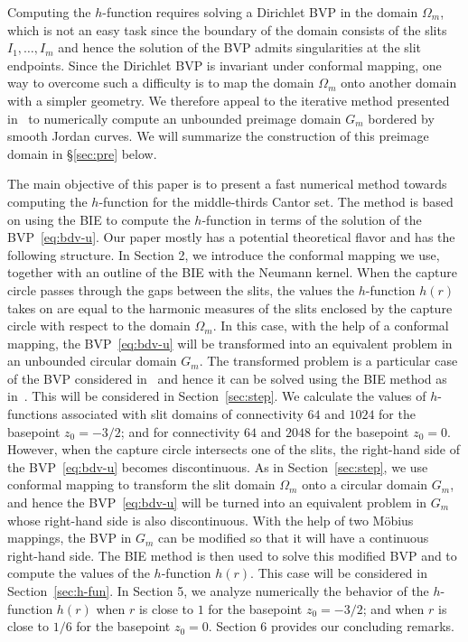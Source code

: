 Computing the $h$-function requires solving a Dirichlet BVP in the domain $\Omega_m$, which is not an easy task since the boundary of the domain consists of the slits $I_1,\ldots,I_m$ and hence the solution of the BVP admits singularities at the slit endpoints. 
Since the Dirichlet BVP is invariant under conformal mapping, one way to overcome such a difficulty is to map the domain $\Omega_m$ onto another domain with a simpler geometry. 
We therefore appeal to the iterative method presented in~\cite{NG18} to numerically compute an unbounded preimage domain $G_m$ bordered by smooth Jordan curves. 
We will summarize the construction of this preimage domain in \S\ref{sec:pre} below. 


The main objective of this paper is to present a fast numerical method towards computing the $h$-function for the middle-thirds Cantor set. 
The method is based on using the BIE to compute the $h$-function in terms of the solution of the BVP~\eqref{eq:bdv-u}.
Our paper mostly has a potential theoretical flavor and has the following structure. 
In Section 2, we introduce the conformal mapping we use, together with an outline of the BIE with the Neumann kernel. 
When the capture circle passes through the gaps between the slits, the values the $h$-function $h(r)$ takes on are equal to the harmonic measures of the slits enclosed by the capture circle with respect to the domain $\Omega_m$. In this case, with the help of a conformal mapping, the BVP~\eqref{eq:bdv-u} will be transformed into an equivalent problem in an unbounded circular domain $G_m$.
The transformed problem is a particular case of the BVP considered in~\cite{Nvm} and hence it can be solved using the BIE method as in~\cite{Nvm}. This will be considered in Section~\ref{sec:step}. 
We calculate the values of $h$-functions associated with slit domains of connectivity $64$ and $1024$ for the basepoint $z_0=-3/2$; and for connectivity $64$ and $2048$ for the basepoint $z_0=0$. However, when the capture circle intersects one of the slits, the right-hand side of the BVP~\eqref{eq:bdv-u} becomes discontinuous. As in  Section~\ref{sec:step}, we use conformal mapping to transform the slit domain $\Omega_m$ onto a circular domain $G_m$, and hence the BVP~\eqref{eq:bdv-u} will be turned into an equivalent problem in $G_m$ whose right-hand side is also discontinuous. With the help of two M{\"o}bius mappings, the BVP in $G_m$ can be modified so that it will have a continuous right-hand side. 
The BIE method is then used to solve this modified BVP and to compute the values of the $h$-function $h(r)$. This case will be considered in Section~\ref{sec:h-fun}.
In Section 5, we analyze numerically the behavior of the $h$-function $h(r)$ when $r$ is close to $1$ for the basepoint $z_0=-3/2$; and when $r$ is close to $1/6$ for the basepoint $z_0=0$. Section 6 provides our concluding remarks.

